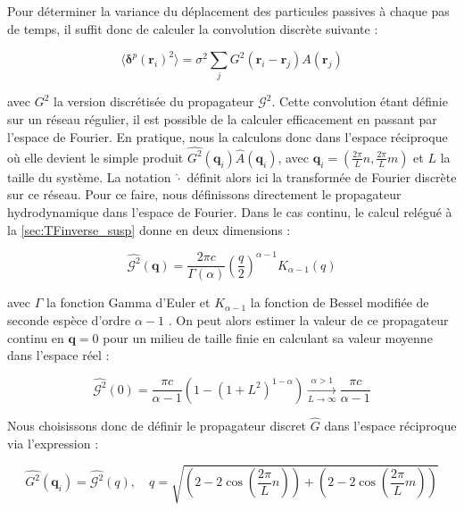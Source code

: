 \subparagraph{}Pour déterminer la variance du déplacement des particules passives à chaque pas de temps, il suffit donc de calculer la convolution discrète suivante :

\begin{equation}
	\langle \boldsymbol\delta^p(\mathbf{r}_i)^2\rangle = \sigma^2\sum_{j} G^2(\mathbf{r}_i-\mathbf{r}_j) A(\mathbf{r}_j)
	\label{eq:kick_discret}
\end{equation}

\noindent avec $G^2$ la version discrétisée du propagateur $\mathcal{G}^2$. Cette convolution étant définie sur un réseau régulier, il est possible de la calculer efficacement en passant par l'espace de Fourier. En pratique, nous la calculons donc dans l'espace réciproque où elle devient le simple produit $\hat{G^2}(\mathbf{q}_i)\hat{A}(\mathbf{q}_i)$, avec $\mathbf{q}_i = (\frac{2\pi}{L}n, \frac{2\pi}{L}m)$ et $L$ la taille du système. La notation $\hat{\cdot}$ définit alors ici la transformée de Fourier discrète sur ce réseau. Pour ce faire, nous définissons directement le propagateur hydrodynamique dans l'espace de Fourier. Dans le cas continu, le calcul relégué à la \autoref{sec:TFinverse_susp} donne en deux dimensions :

\begin{equation}
	\hat{\mathcal{G}^2}(\mathbf{q})=\frac{2\pi c}{\Gamma\left(\alpha\right)} \left( \frac{q}{2} \right)^{\alpha-1}K_{\alpha-1}(q)
	\label{eq:propcontinu2D}
\end{equation}

\noindent avec $\Gamma$ la fonction Gamma d'Euler et $K_{\alpha -1}$ la fonction de Bessel modifiée de seconde espèce d'ordre $\alpha - 1$ \cite{abramowitz_handbook_1965}. On peut alors estimer la valeur de ce propagateur continu en $\mathbf{q}=0$ pour un milieu de taille finie en calculant sa valeur moyenne dans l'espace réel :

\begin{equation}
	\hat{\mathcal{G}^2}(0) = \frac{\pi c}{\alpha -1}\left( 1- \left( 1+L^2 \right)^{1-\alpha} \right) \xrightarrow[L\rightarrow\infty]{\alpha > 1} \frac{\pi c}{\alpha - 1}
	\label{eq:zerovalue}
\end{equation}

\noindent Nous choisissons donc de définir le propagateur discret $\hat{G}$ dans l'espace réciproque via l'expression :

\begin{equation}
	\hat{G^2}(\mathbf{q}_i) = \hat{\mathcal{G}^2}(q), \quad q = \sqrt{\left( 2-2\cos \left( \frac{2\pi}{L}n \right) \right) + \left( 2-2\cos \left( \frac{2\pi}{L}m \right) \right)}
\end{equation}

